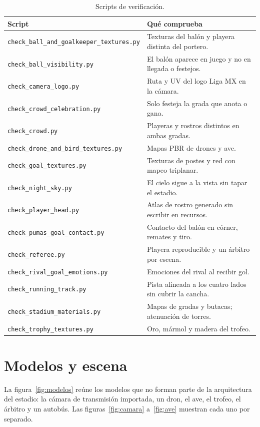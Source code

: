\documentclass[12pt,letterpaper]{article}
\begin{document}
\begin{table}[H]
\centering
\small
\begin{tabular}{p{}p{}}
\toprule
\textbf{Script} & \textbf{Qué comprueba}\\
\midrule
\texttt{check\_ball\_and\_goalkeeper\_textures.py} & Texturas del balón y playera distinta del portero.\\
\texttt{check\_ball\_visibility.py} & El balón aparece en juego y no en llegada o festejos.\\
\texttt{check\_camera\_logo.py} & Ruta y UV del logo Liga MX en la cámara.\\
\texttt{check\_crowd\_celebration.py} & Solo festeja la grada que anota o gana.\\
\texttt{check\_crowd.py} & Playeras y rostros distintos en ambas gradas.\\
\texttt{check\_drone\_and\_bird\_textures.py} & Mapas PBR de drones y ave.\\
\texttt{check\_goal\_textures.py} & Texturas de postes y red con mapeo triplanar.\\
\texttt{check\_night\_sky.py} & El cielo sigue a la vista sin tapar el estadio.\\
\texttt{check\_player\_head.py} & Atlas de rostro generado sin escribir en recursos.\\
\texttt{check\_pumas\_goal\_contact.py} & Contacto del balón en córner, remates y tiro.\\
\texttt{check\_referee.py} & Playera reproducible y un árbitro por escena.\\
\texttt{check\_rival\_goal\_emotions.py} & Emociones del rival al recibir gol.\\
\texttt{check\_running\_track.py} & Pista alineada a los cuatro lados sin cubrir la cancha.\\
\texttt{check\_stadium\_materials.py} & Mapas de gradas y butacas; atenuación de torres.\\
\texttt{check\_trophy\_textures.py} & Oro, mármol y madera del trofeo.\\
\bottomrule
\end{tabular}
\caption{Scripts de verificación.}\label{tab:pruebas}
\end{table}

\section{Modelos y escena}
La figura~\ref{fig:modelos} reúne los modelos que no forman parte de la arquitectura del estadio:
la cámara de transmisión importada, un dron, el ave, el trofeo, el árbitro y un autobús. Las
figuras~\ref{fig:camara} a~\ref{fig:ave} muestran cada uno por separado.
\end{document}
